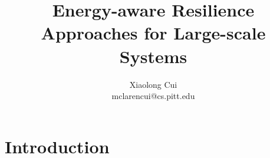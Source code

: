 \documentclass[11pt]{article}
\title{Energy-aware Resilience Approaches for Large-scale Systems}
\author
{Xiaolong Cui\\
\normalsize{mclarencui@cs.pitt.edu}\\
}
\date{}
\newenvironment{sciabstract}{%
\begin{quote} \bf}
{\end{quote}}
\begin{document}
 




\maketitle 








\section{Introduction}
\label{sec:intro}

\end{document}
